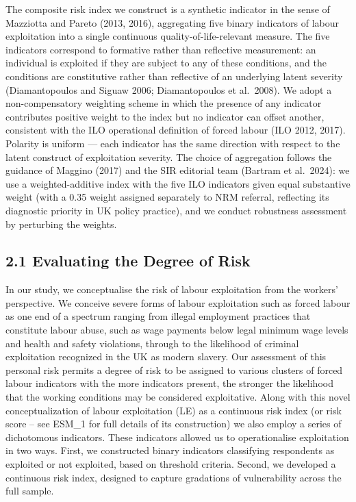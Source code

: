 \documentclass[
  12pt,
  letterpaper,
  DIV=11,
  numbers=noendperiod]{scrartcl}
\begin{document}
The composite risk index we construct is a synthetic indicator in the
sense of Mazziotta and Pareto (2013, 2016), aggregating five binary
indicators of labour exploitation into a single continuous
quality-of-life-relevant measure. The five indicators correspond to
formative rather than reflective measurement: an individual is exploited
if they are subject to any of these conditions, and the conditions are
constitutive rather than reflective of an underlying latent severity
(Diamantopoulos and Siguaw 2006; Diamantopoulos et al.~2008). We adopt a
non-compensatory weighting scheme in which the presence of any indicator
contributes positive weight to the index but no indicator can offset
another, consistent with the ILO operational definition of forced labour
(ILO 2012, 2017). Polarity is uniform --- each indicator has the same
direction with respect to the latent construct of exploitation severity.
The choice of aggregation follows the guidance of Maggino (2017) and the
SIR editorial team (Bartram et al.~2024): we use a weighted-additive
index with the five ILO indicators given equal substantive weight (with
a 0.35 weight assigned separately to NRM referral, reflecting its
diagnostic priority in UK policy practice), and we conduct robustness
assessment by perturbing the weights.

\subsection{2.1 Evaluating the Degree of
Risk}\label{evaluating-the-degree-of-risk}

In our study, we conceptualise the risk of labour exploitation from the
workers' perspective. We conceive severe forms of labour exploitation
such as forced labour as one end of a spectrum ranging from illegal
employment practices that constitute labour abuse, such as wage payments
below legal minimum wage levels and health and safety violations,
through to the likelihood of criminal exploitation recognized in the UK
as modern slavery. Our assessment of this personal risk permits a degree
of risk to be assigned to various clusters of forced labour indicators
with the more indicators present, the stronger the likelihood that the
working conditions may be considered exploitative. Along with this novel
conceptualization of labour exploitation (LE) as a continuous risk index
(or risk score -- see ESM\_1 for full details of its construction) we
also employ a series of dichotomous indicators. These indicators allowed
us to operationalise exploitation in two ways. First, we constructed
binary indicators classifying respondents as exploited or not exploited,
based on threshold criteria. Second, we developed a continuous risk
index, designed to capture gradations of vulnerability across the full
sample.
\end{document}
